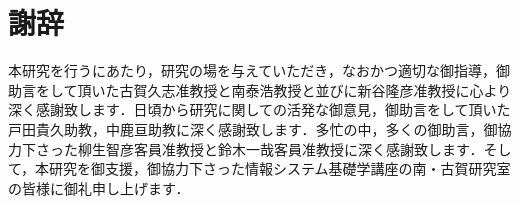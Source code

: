 \chapter*{\huge 謝辞}
本研究を行うにあたり，研究の場を与えていただき，なおかつ適切な御指導，御助言をして頂いた古賀久志准教授と南泰浩教授と並びに新谷隆彦准教授に心より深く感謝致します．日頃から研究に関しての活発な御意見，御助言をして頂いた戸田貴久助教，中鹿亘助教に深く感謝致します．多忙の中，多くの御助言，御協力下さった柳生智彦客員准教授と鈴木一哉客員准教授に深く感謝致します．そして，本研究を御支援，御協力下さった情報システム基礎学講座の南・古賀研究室の皆様に御礼申し上げます．